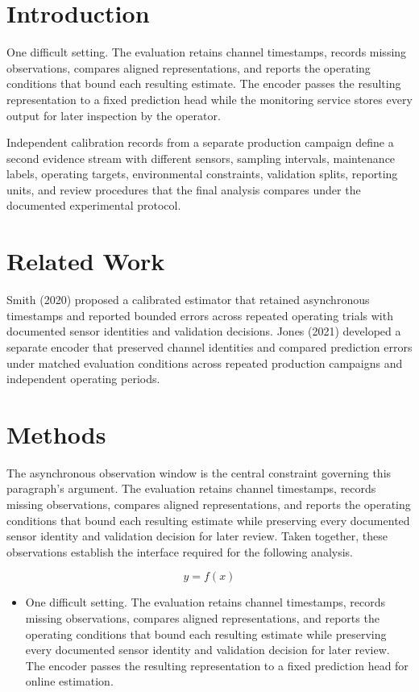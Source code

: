 \section{Introduction}
One difficult setting. The evaluation retains channel timestamps, records missing observations, compares aligned representations, and reports the operating conditions that bound each resulting estimate. The encoder passes the resulting representation to a fixed prediction head while the monitoring service stores every output for later inspection by the operator.

Independent calibration records from a separate production campaign define a second evidence stream with different sensors, sampling intervals, maintenance labels, operating targets, environmental constraints, validation splits, reporting units, and review procedures that the final analysis compares under the documented experimental protocol.

\section{Related Work}
Smith (2020) proposed a calibrated estimator that retained asynchronous timestamps and reported bounded errors across repeated operating trials with documented sensor identities and validation decisions. Jones (2021) developed a separate encoder that preserved channel identities and compared prediction errors under matched evaluation conditions across repeated production campaigns and independent operating periods.

\section{Methods}
The asynchronous observation window is the central constraint governing this paragraph's argument. The evaluation retains channel timestamps, records missing observations, compares aligned representations, and reports the operating conditions that bound each resulting estimate while preserving every documented sensor identity and validation decision for later review. Taken together, these observations establish the interface required for the following analysis.

\begin{equation}
y = f(x)
\end{equation}

\begin{itemize}
\item One difficult setting. The evaluation retains channel timestamps, records missing observations, compares aligned representations, and reports the operating conditions that bound each resulting estimate while preserving every documented sensor identity and validation decision for later review. The encoder passes the resulting representation to a fixed prediction head for online estimation.
\end{itemize}
